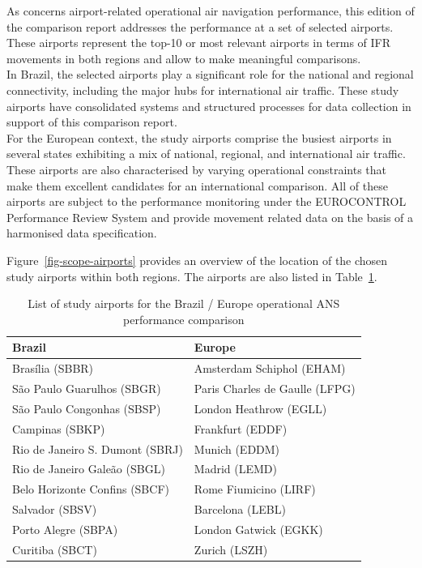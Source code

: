 \documentclass[
  a4paper,
  DIV=11,
  numbers=noendperiod]{scrreport}
\begin{document}
As concerns airport-related operational air navigation performance, this
edition of the comparison report addresses the performance at a set of
selected airports. These airports represent the top-10 or most relevant
airports in terms of IFR movements in both regions and allow to make
meaningful comparisons.\\
In Brazil, the selected airports play a significant role for the
national and regional connectivity, including the major hubs for
international air traffic. These study airports have consolidated
systems and structured processes for data collection in support of this
comparison report.\\
For the European context, the study airports comprise the busiest
airports in several states exhibiting a mix of national, regional, and
international air traffic. These airports are also characterised by
varying operational constraints that make them excellent candidates for
an international comparison. All of these airports are subject to the
performance monitoring under the EUROCONTROL Performance Review System
and provide movement related data on the basis of a harmonised data
specification.

Figure~\ref{fig-scope-airports} provides an overview of the location of
the chosen study airports within both regions. The airports are also
listed in Table~\ref{tbl-scopetable}.

\hypertarget{tbl-scopetable}{}
\begin{longtable}{ll}
\caption{\label{tbl-scopetable}List of study airports for the Brazil / Europe operational ANS
performance comparison }\tabularnewline

\toprule
Brazil & Europe \\ 
\midrule\addlinespace[2.5pt]
Brasília (SBBR) & Amsterdam Schiphol (EHAM) \\ 
São Paulo Guarulhos (SBGR) & Paris Charles de Gaulle (LFPG) \\ 
São Paulo Congonhas (SBSP) & London Heathrow (EGLL) \\ 
Campinas (SBKP) & Frankfurt (EDDF) \\ 
Rio de Janeiro S. Dumont  (SBRJ) & Munich (EDDM) \\ 
Rio de Janeiro Galeão (SBGL) & Madrid (LEMD) \\ 
Belo Horizonte Confins (SBCF) & Rome Fiumicino (LIRF) \\ 
Salvador (SBSV) & Barcelona (LEBL) \\ 
Porto Alegre (SBPA) & London Gatwick (EGKK) \\ 
Curitiba (SBCT) & Zurich (LSZH) \\ 
\bottomrule
\end{longtable}
\end{document}
